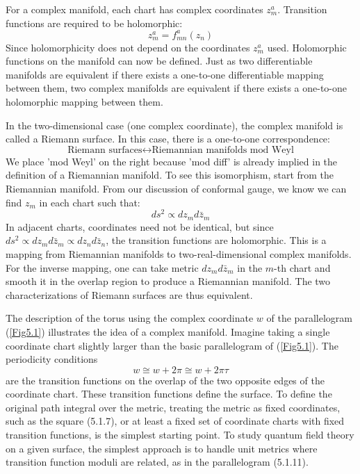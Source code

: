 For a complex manifold, each chart has complex coordinates $z_{m}^{a}$. Transition functions are required to be holomorphic:
\begin{equation}
	z_{m}^{a}=f_{m n}^{a}\left(z_{n}\right)\label{5.2.13}		
\end{equation}
Since holomorphicity does not depend on the coordinates $z_{m}^{a}$ used. Holomorphic functions on the manifold can now be defined. Just as two differentiable manifolds are equivalent if there exists a one-to-one differentiable mapping between them, two complex manifolds are equivalent if there exists a one-to-one holomorphic mapping between them.

In the two-dimensional case (one complex coordinate), the complex manifold is called a Riemann surface. In this case, there is a one-to-one correspondence:
\begin{equation}
	\text{Riemann surfaces} \leftrightarrow \text{Riemannian manifolds mod Weyl}
\end{equation}
We place 'mod Weyl' on the right because 'mod diff' is already implied in the definition of a Riemannian manifold. To see this isomorphism, start from the Riemannian manifold. From our discussion of conformal gauge, we know we can find $z_{m}$ in each chart such that:
\begin{equation}
	d s^{2} \propto d z_{m} d \bar{z}_{m}
\end{equation}
In adjacent charts, coordinates need not be identical, but since $d s^{2} \propto d z_{m} d \bar{z}_{m} \propto d z_{n} d \bar{z}_{n}$, the transition functions are holomorphic. This is a mapping from Riemannian manifolds to two-real-dimensional complex manifolds. For the inverse mapping, one can take metric $d z_{m} d \bar{z}_{m}$ in the $m$-th chart and smooth it in the overlap region to produce a Riemannian manifold. The two characterizations of Riemann surfaces are thus equivalent.

The description of the torus using the complex coordinate $w$ of the parallelogram (\ref{Fig5.1}) illustrates the idea of a complex manifold. Imagine taking a single coordinate chart slightly larger than the basic parallelogram of (\ref{Fig5.1}). The periodicity conditions
\begin{equation}
	w \cong w+2 \pi \cong w+2 \pi \tau
\end{equation}
are the transition functions on the overlap of the two opposite edges of the coordinate chart. These transition functions define the surface. To define the original path integral over the metric, treating the metric as fixed coordinates, such as the square (5.1.7), or at least a fixed set of coordinate charts with fixed transition functions, is the simplest starting point. To study quantum field theory on a given surface, the simplest approach is to handle unit metrics where transition function moduli are related, as in the parallelogram (5.1.11).

